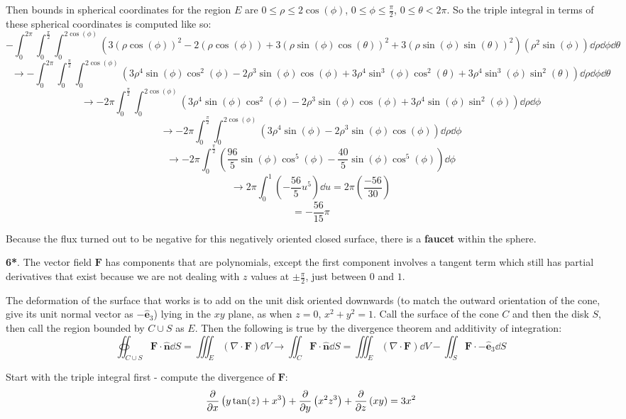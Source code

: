 \documentclass[11pt]{article}
\newcommand{\br}[1]{\left(#1\right)}
\begin{document}
Then bounds in spherical coordinates for the region $E$ are $0\leq \rho \leq 2\cos(\phi)$, $0\leq \phi \leq \frac{\pi}{2}$, $0\leq \theta < 2\pi$. So the triple integral in terms of these spherical coordinates is computed like so:
$$-\int_0^{2\pi}\int_0^{\frac{\pi}{2}}\int_0^{2\cos(\phi)}\br{3\br{\rho \cos(\phi)}^2-2\br{\rho \cos(\phi)}+3\br{\rho\sin(\phi)\cos(\theta)}^2+3\br{\rho \sin(\phi)\sin(\theta)}^2}\br{\rho^2\sin(\phi)}\dd{\rho}\dd{\phi}\dd{\theta}$$
$$\to -\int_0^{2\pi}\int_0^{\frac{\pi}{2}}\int_0^{2\cos(\phi)}\br{3\rho^4 \sin(\phi)\cos^2(\phi)-2\rho^3 \sin(\phi)\cos(\phi)+3\rho^4\sin^3(\phi)\cos^2(\theta)+3\rho^4 \sin^3(\phi)\sin^2(\theta)}\dd{\rho}\dd{\phi}\dd{\theta}$$
$$\to -2\pi\int_0^{\frac{\pi}{2}}\int_0^{2\cos(\phi)}\br{3\rho^4 \sin(\phi)\cos^2(\phi)-2\rho^3 \sin(\phi)\cos(\phi)+3\rho^4\sin(\phi)\sin^2(\phi)}\dd{\rho}\dd{\phi}$$
$$\to -2\pi\int_0^{\frac{\pi}{2}}\int_0^{2\cos(\phi)}\br{3\rho^4 \sin(\phi)-2\rho^3 \sin(\phi)\cos(\phi)}\dd{\rho}\dd{\phi}$$
$$\to -2\pi\int_0^{\frac{\pi}{2}}\br{\frac{96}{5} \sin(\phi)\cos^5(\phi)-\frac{40}{5} \sin(\phi)\cos^5(\phi)}\dd{\phi}$$
$$\to 2\pi \int_0^1 \br{-\frac{56}{5} u^5}\dd{u} = 2\pi\br{\frac{-56}{30}}$$
$$\boxed{= -\frac{56}{15}\pi}$$

Because the flux turned out to be negative for this negatively oriented closed surface, there is a \textbf{faucet} within the sphere.

\noindent\makebox[\linewidth]{\rule{19.1cm}{0.4pt}}

\textbf{6*}. The vector field $\mathbf{F}$ has components that are polynomials, except the first component involves a tangent term which still has partial derivatives that exist because we are not dealing with $z$ values at $\pm \frac{\pi}{2}$, just between $0$ and $1$.

The deformation of the surface that works is to add on the unit disk oriented downwards (to match the outward orientation of the cone, give its unit normal vector as $-\hat{\mathbf{e}}_3$) lying in the $xy$ plane, as when $z=0$, $x^2+y^2 = 1$. Call the surface of the cone $C$ and then the disk $S$, then call the region bounded by $C\cup S$ as $E$. Then the following is true by the divergence theorem and additivity of integration:
$$\oiint_{C\cup S} \mathbf{F}\cdot \hat{\mathbf{n}}\dd{S} = \iiint_E (\nabla \cdot \mathbf{F}) \dd{V} \to \iint_C \mathbf{F}\cdot \hat{\mathbf{n}}\dd{S} = \iiint_E (\nabla \cdot \mathbf{F}) \dd{V} - \iint_S \mathbf{F}\cdot-\hat{\mathbf{e}}_3 \dd{S} $$

Start with the triple integral first - compute the divergence of $\mathbf{F}$:
$$\pdv{x}\br{y\tan(z)+x^3} + \pdv{y}\br{x^2z^3} + \pdv{z}\br{xy} = 3x^2$$
\end{document}
